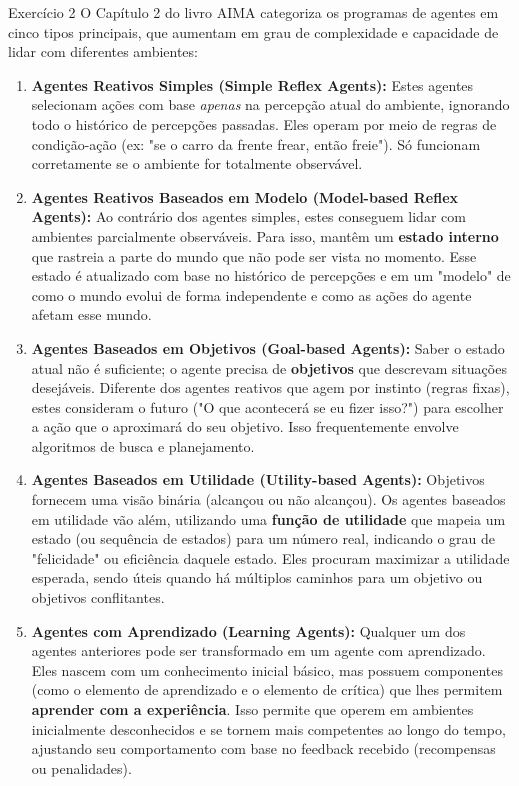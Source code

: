 \documentclass[a4paper,11pt]{article}
\theoremstyle{definition}
\theoremstyle{plain}
\theoremstyle{remark}
\newcounter{questao}[section]
\begin{document}
\begin{questaoManually}{Exercício 2}
  O Capítulo 2 do livro AIMA categoriza os programas de agentes em cinco tipos principais, que aumentam em grau de complexidade e capacidade de lidar com diferentes ambientes:

  \begin{enumerate}[label=\textbf{\arabic*.}]
    \item \textbf{Agentes Reativos Simples (Simple Reflex Agents):}
    Estes agentes selecionam ações com base \textit{apenas} na percepção atual do ambiente, ignorando todo o histórico de percepções passadas. Eles operam por meio de regras de condição-ação (ex: "se o carro da frente frear, então freie"). Só funcionam corretamente se o ambiente for totalmente observável.

    \item \textbf{Agentes Reativos Baseados em Modelo (Model-based Reflex Agents):}
    Ao contrário dos agentes simples, estes conseguem lidar com ambientes parcialmente observáveis. Para isso, mantêm um \textbf{estado interno} que rastreia a parte do mundo que não pode ser vista no momento. Esse estado é atualizado com base no histórico de percepções e em um "modelo" de como o mundo evolui de forma independente e como as ações do agente afetam esse mundo.

    \item \textbf{Agentes Baseados em Objetivos (Goal-based Agents):}
    Saber o estado atual não é suficiente; o agente precisa de \textbf{objetivos} que descrevam situações desejáveis. Diferente dos agentes reativos que agem por instinto (regras fixas), estes consideram o futuro ("O que acontecerá se eu fizer isso?") para escolher a ação que o aproximará do seu objetivo. Isso frequentemente envolve algoritmos de busca e planejamento.

    \item \textbf{Agentes Baseados em Utilidade (Utility-based Agents):}
    Objetivos fornecem uma visão binária (alcançou ou não alcançou). Os agentes baseados em utilidade vão além, utilizando uma \textbf{função de utilidade} que mapeia um estado (ou sequência de estados) para um número real, indicando o grau de "felicidade" ou eficiência daquele estado. Eles procuram maximizar a utilidade esperada, sendo úteis quando há múltiplos caminhos para um objetivo ou objetivos conflitantes.

    \item \textbf{Agentes com Aprendizado (Learning Agents):}
    Qualquer um dos agentes anteriores pode ser transformado em um agente com aprendizado. Eles nascem com um conhecimento inicial básico, mas possuem componentes (como o elemento de aprendizado e o elemento de crítica) que lhes permitem \textbf{aprender com a experiência}. Isso permite que operem em ambientes inicialmente desconhecidos e se tornem mais competentes ao longo do tempo, ajustando seu comportamento com base no feedback recebido (recompensas ou penalidades).
  \end{enumerate}
\end{questaoManually}
\end{document}

